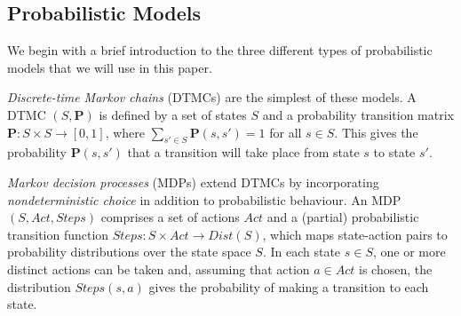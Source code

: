 \documentclass{llncs}
\begin{document}

\subsection{Probabilistic Models}

We begin with a brief introduction to the three different types of probabilistic models
that we will use in this paper.

\emph{Discrete-time Markov chains} (DTMCs) are the simplest of these models.
A DTMC $(S,\mathbf{P})$ is defined by a set of states $S$ and a probability transition matrix
$\mathbf{P} : S\times S \rightarrow [0, 1]$, where $\sum_{s'\in S} \mathbf{P}(s, s') = 1$ for all $s \in  S$.
This gives the probability $\mathbf{P}(s, s')$ that a transition will take place from state $s$ to state $s'$.

\emph{Markov decision processes} (MDPs) extend DTMCs by incorporating \emph{nondeterministic choice}
in addition to probabilistic behaviour.
An MDP $(S,Act,Steps)$ comprises a set of actions $Act$
and a (partial) probabilistic transition function $Steps:S\times Act\rightarrow Dist(S)$,
which maps state-action pairs to probability distributions over the state space $S$.
In each state $s\in S$, one or more distinct actions can be taken and, assuming that action $a\in Act$ is chosen,
the distribution $Steps(s,a)$ gives the probability of making a transition to each state.


\end{document}
